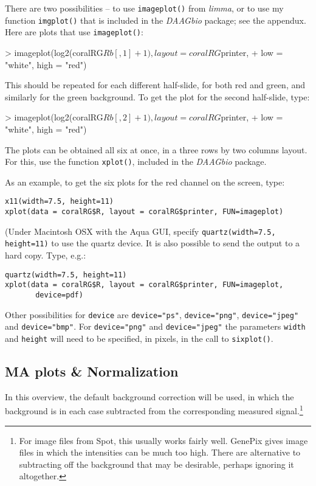 \documentclass[a4paper,9pt]{article}
\begin{document}
There are two possibilities -- to use \texttt{imageplot()} from
\textit{limma}, or to use my function \texttt{imgplot()} that is
included in the \textit{DAAGbio} package; see the appendux.  Here are
plots that use \texttt{imageplot()}:
\begin{Schunk}
\begin{Sinput}
> imageplot(log2(coralRG$Rb[, 1] + 1), layout = coralRG$printer, 
+     low = "white", high = "red")
\end{Sinput}
\end{Schunk}
This should be repeated for each different half-slide, for both red and
green, and similarly for the green background.  To get the plot for the
second half-slide, type:
\begin{Schunk}
\begin{Sinput}
> imageplot(log2(coralRG$Rb[, 2] + 1), layout = coralRG$printer, 
+     low = "white", high = "red")
\end{Sinput}
\end{Schunk}

The plots can be obtained all six at once, in a three rows by two
columns layout.  For this, use the function \texttt{xplot()},
included in the \textit{DAAGbio} package.

As an example, to get the six plots for the red channel on the screen, type:
\begin{verbatim}
x11(width=7.5, height=11)
xplot(data = coralRG$R, layout = coralRG$printer, FUN=imageplot)
\end{verbatim}
(Under Macintosh OSX with the Aqua GUI, specify
\texttt{quartz(width=7.5, height=11)} to use the quartz device.
It is also possible to send the output to a hard copy.  Type, e.g.:
\begin{verbatim}
quartz(width=7.5, height=11)
xplot(data = coralRG$R, layout = coralRG$printer, FUN=imageplot,
       device=pdf)
\end{verbatim}
Other possibilities for \texttt{device} are \texttt{device="ps"},
\texttt{device="png"}, \texttt{device="jpeg"} and
\texttt{device="bmp"}.  For \texttt{device="png"} and
\texttt{device="jpeg"} the parameters \texttt{width} and
\texttt{height} will need to be specified, in pixels, in the call to
\texttt{sixplot()}.

\subsection{MA plots \& Normalization}
In this overview, the default background correction will be used, in
which the background is in each case subtracted from the corresponding
measured signal.\footnote{For image files from Spot, this usually
works fairly well.  GenePix gives image files in which the intensities
can be much too high.  There are alternative to subtracting off the
background that may be desirable, perhaps ignoring it altogether.}
\end{document}
